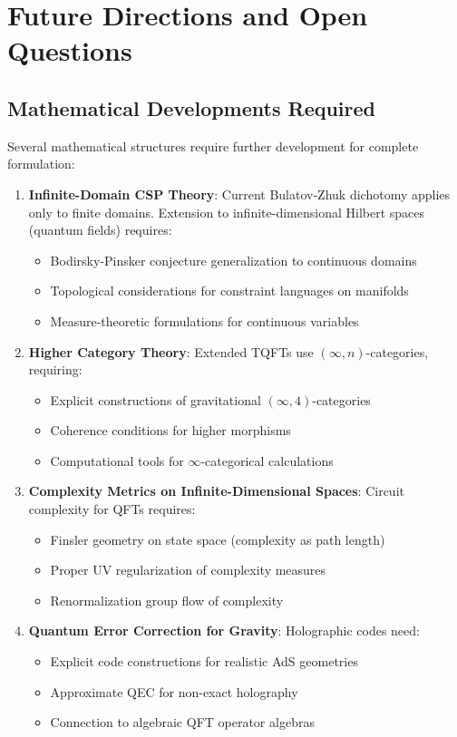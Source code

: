 \documentclass[11pt,a4paper]{article}
\theoremstyle{remark}
\theoremstyle{definition}
\begin{document}
\section{Future Directions and Open Questions}
\label{sec:future_directions}

\subsection{Mathematical Developments Required}

Several mathematical structures require further development for complete formulation:

\begin{enumerate}
\item \textbf{Infinite-Domain CSP Theory}: Current Bulatov-Zhuk dichotomy applies only to finite domains. Extension to infinite-dimensional Hilbert spaces (quantum fields) requires:
\begin{itemize}
\item Bodirsky-Pinsker conjecture generalization to continuous domains
\item Topological considerations for constraint languages on manifolds
\item Measure-theoretic formulations for continuous variables
\end{itemize}

\item \textbf{Higher Category Theory}: Extended TQFTs use $(\infty, n)$-categories, requiring:
\begin{itemize}
\item Explicit constructions of gravitational $(\infty, 4)$-categories
\item Coherence conditions for higher morphisms
\item Computational tools for $\infty$-categorical calculations
\end{itemize}

\item \textbf{Complexity Metrics on Infinite-Dimensional Spaces}: Circuit complexity for QFTs requires:
\begin{itemize}
\item Finsler geometry on state space (complexity as path length)
\item Proper UV regularization of complexity measures
\item Renormalization group flow of complexity
\end{itemize}

\item \textbf{Quantum Error Correction for Gravity}: Holographic codes need:
\begin{itemize}
\item Explicit code constructions for realistic AdS geometries
\item Approximate QEC for non-exact holography
\item Connection to algebraic QFT operator algebras
\end{itemize}
\end{enumerate}
\end{document}
